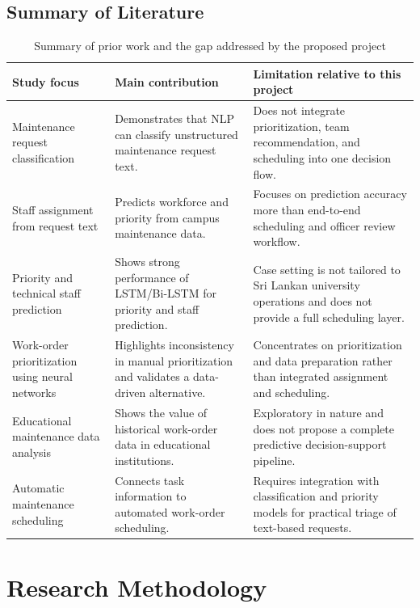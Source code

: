 \documentclass[11pt,a4paper]{report}
\begin{document}
\section{Summary of Literature}
\begin{table}[H]
\centering
\small
\caption{Summary of prior work and the gap addressed by the proposed project}
\begin{tabularx}{\textwidth}{|p{3cm}|X|X|}
\hline
\textbf{Study focus} & \textbf{Main contribution} & \textbf{Limitation relative to this project} \\
\hline
Maintenance request classification \cite{bouabdallaoui2020} & Demonstrates that \ac{NLP} can classify unstructured maintenance request text. & Does not integrate prioritization, team recommendation, and scheduling into one decision flow. \\
\hline
Staff assignment from request text \cite{mo2020} & Predicts workforce and priority from campus maintenance data. & Focuses on prediction accuracy more than end-to-end scheduling and officer review workflow. \\
\hline
Priority and technical staff prediction \cite{dorazio2023} & Shows strong performance of \ac{LSTM}/Bi-LSTM for priority and staff prediction. & Case setting is not tailored to Sri Lankan university operations and does not provide a full scheduling layer. \\
\hline
Work-order prioritization using neural networks \cite{ensafi2024} & Highlights inconsistency in manual prioritization and validates a data-driven alternative. & Concentrates on prioritization and data preparation rather than integrated assignment and scheduling. \\
\hline
Educational maintenance data analysis \cite{besiktepe2019} & Shows the value of historical work-order data in educational institutions. & Exploratory in nature and does not propose a complete predictive decision-support pipeline. \\
\hline
Automatic maintenance scheduling \cite{chen2018} & Connects task information to automated work-order scheduling. & Requires integration with classification and priority models for practical triage of text-based requests. \\
\hline
\end{tabularx}
\end{table}

\chapter{Research Methodology}
\end{document}
